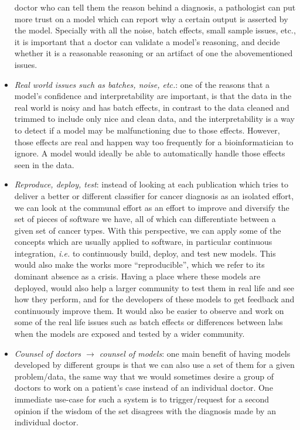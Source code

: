 \begin{itemize}
    doctor who can tell them the reason behind a diagnosis, a pathologist can
    put more trust on a model which can report why a certain output is asserted
    by the model. Specially with all the noise, batch effects, small sample
    issues, etc., it is important that a doctor can validate a model's
    reasoning, and decide whether it is a reasonable reasoning or an artifact
    of one the abovementioned issues.
  \item \emph{Real world issues such as batches, noise, etc.}: one of the
    reasons that a model's confidence and interpretability are important, is
    that the data in the real world is noisy and has batch effects, in contrast
    to the data cleaned and trimmed to include only nice and clean data, and
    the interpretability is a way to detect if a model may be malfunctioning
    due to those effects. However, those effects are real and happen way too
    frequently for a bioinformatician to ignore. A model would ideally be able
    to automatically handle those effects seen in the data.
  \item \emph{Reproduce, deploy, test}: instead of looking at each publication
    which tries to deliver a better or different classifier for cancer
    diagnosis as an isolated effort, we can look at the communal effort as an
    effort to improve and diversify the set of pieces of software we have, all
    of which can differentiate between a given set of cancer types. With this
    perspective, we can apply some of the concepts which are usually applied to
    software, in particular continuous integration, \emph{i.e.} to continuously
    build, deploy, and test new models. This would also make the works more
    ``reproducible'', which we refer to its dominant absence as a crisis.
    Having a place where these models are deployed, would also help a larger
    community to test them in real life and see how they perform, and for the
    developers of these models to get feedback and continuously improve them.
    It would also be easier to observe and work on some of the real life issues
    such as batch effects or differences between labs when the models are
    exposed and tested by a wider community.
  \item \emph{Counsel of doctors $\rightarrow$ counsel of models}: one main
    benefit of having models developed by different groups is that we can also
    use a set of them for a given problem/data, the same way that we would
    sometimes desire a group of doctors to work on a patient's case instead of
    an individual doctor. One immediate use-case for such a system is to
    trigger/request for a second opinion if the wisdom of the set disagrees
    with the diagnosis made by an individual doctor.
\end{itemize}

